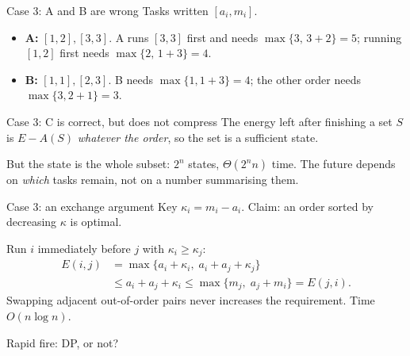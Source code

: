 \begin{frame}{Case 3: A and B are wrong}
	Tasks written $[a_i,m_i]$.
	\begin{itemize}
		\item \textbf{A:} $[1,2],[3,3]$. A runs $[3,3]$ first and needs $\max\{3,\,3+2\}=5$;
		running $[1,2]$ first needs $\max\{2,\,1+3\}=4$.
		\item \textbf{B:} $[1,1],[2,3]$. B needs $\max\{1,1+3\}=4$; the other order needs $\max\{3,2+1\}=3$.
	\end{itemize}
\end{frame}

\begin{frame}{Case 3: C is correct, but does not compress}
	The energy left after finishing a set $S$ is $E-A(S)$ \emph{whatever the order}, so
	the set is a sufficient state.

	\seprule

	But the state is the \alert{whole subset}: $2^n$ states, $\Theta(2^nn)$ time.
	The future depends on \emph{which} tasks remain, not on a number summarising them.
\end{frame}

\begin{frame}{Case 3: an exchange argument}
	Key $\kappa_i=m_i-a_i$. \alert{Claim:} an order sorted by decreasing $\kappa$ is optimal.

	\vspace{0.5em}
	Run $i$ immediately before $j$ with $\kappa_i\ge\kappa_j$:
	\begin{align*}
		E(i,j)&=\max\{a_i+\kappa_i,\;a_i+a_j+\kappa_j\}\\
		&\le a_i+a_j+\kappa_i\le \max\{m_j,\;a_j+m_i\}=E(j,i).
	\end{align*}
	Swapping adjacent out-of-order pairs never increases the requirement. Time $O(n\log n)$.
\end{frame}

\begin{frame}{Rapid fire: DP, or not?}
\end{frame}

